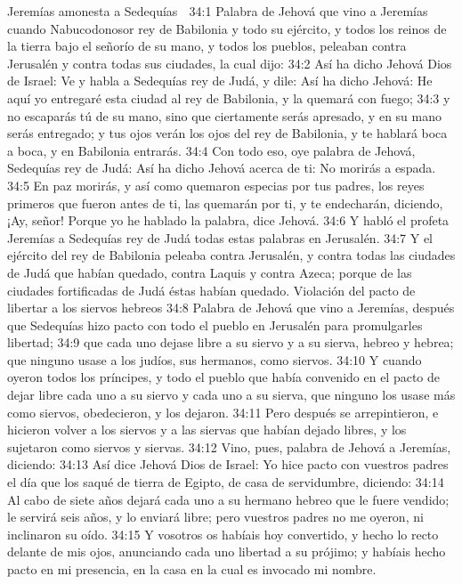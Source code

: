 Jeremías amonesta a Sedequías  

34:1 Palabra de Jehová que vino a Jeremías cuando Nabucodonosor rey de Babilonia y todo su ejército, y todos los reinos de la tierra bajo el señorío de su mano, y todos los pueblos, peleaban contra Jerusalén y contra todas sus ciudades, la cual dijo:  
34:2 Así ha dicho Jehová Dios de Israel: Ve y habla a Sedequías rey de Judá, y dile: Así ha dicho Jehová: He aquí yo entregaré esta ciudad al rey de Babilonia, y la quemará con fuego;  
34:3 y no escaparás tú de su mano, sino que ciertamente serás apresado, y en su mano serás entregado; y tus ojos verán los ojos del rey de Babilonia, y te hablará boca a boca, y en Babilonia entrarás.  
34:4 Con todo eso, oye palabra de Jehová, Sedequías rey de Judá: Así ha dicho Jehová acerca de ti: No morirás a espada.  
34:5 En paz morirás, y así como quemaron especias por tus padres, los reyes primeros que fueron antes de ti, las quemarán por ti, y te endecharán, diciendo, ¡Ay, señor! Porque yo he hablado la palabra, dice Jehová.  
34:6 Y habló el profeta Jeremías a Sedequías rey de Judá todas estas palabras en Jerusalén.  
34:7 Y el ejército del rey de Babilonia peleaba contra Jerusalén, y contra todas las ciudades de Judá que habían quedado, contra Laquis y contra Azeca; porque de las ciudades fortificadas de Judá éstas habían quedado.  
Violación del pacto de libertar a los siervos hebreos  
34:8 Palabra de Jehová que vino a Jeremías, después que Sedequías hizo pacto con todo el pueblo en Jerusalén para promulgarles libertad;  
34:9 que cada uno dejase libre a su siervo y a su sierva, hebreo y hebrea; que ninguno usase a los judíos, sus hermanos, como siervos.  
34:10 Y cuando oyeron todos los príncipes, y todo el pueblo que había convenido en el pacto de dejar libre cada uno a su siervo y cada uno a su sierva, que ninguno los usase más como siervos, obedecieron, y los dejaron.  
34:11 Pero después se arrepintieron, e hicieron volver a los siervos y a las siervas que habían dejado libres, y los sujetaron como siervos y siervas.  
34:12 Vino, pues, palabra de Jehová a Jeremías, diciendo:  
34:13 Así dice Jehová Dios de Israel: Yo hice pacto con vuestros padres el día que los saqué de tierra de Egipto, de casa de servidumbre, diciendo:  
34:14 Al cabo de siete años dejará cada uno a su hermano hebreo que le fuere vendido; le servirá seis años, y lo enviará libre; pero vuestros padres no me oyeron, ni inclinaron su oído.  
34:15 Y vosotros os habíais hoy convertido, y hecho lo recto delante de mis ojos, anunciando cada uno libertad a su prójimo; y habíais hecho pacto en mi presencia, en la casa en la cual es invocado mi nombre.  
